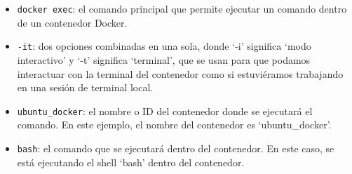\documentclass{article}
\begin{document}
\begin{itemize}
      \item \lstinline{docker exec}: el comando principal que permite ejecutar un comando dentro de un contenedor Docker.
      \item \lstinline{-it}: dos opciones combinadas en una sola, donde \enquote*{-i} significa \enquote*{modo interactivo} y \enquote*{-t} significa \enquote*{terminal}, que se usan para que podamos interactuar con la terminal del contenedor como si estuviéramos trabajando en una sesión de terminal local.
      \item \lstinline{ubuntu_docker}: el nombre o ID del contenedor donde se ejecutará el comando. En este ejemplo, el nombre del contenedor es \enquote*{ubuntu\_docker}.
      \item \lstinline{bash}: el comando que se ejecutará dentro del contenedor. En este caso, se está ejecutando el shell \enquote*{bash} dentro del contenedor.
\end{itemize}
\end{document}
